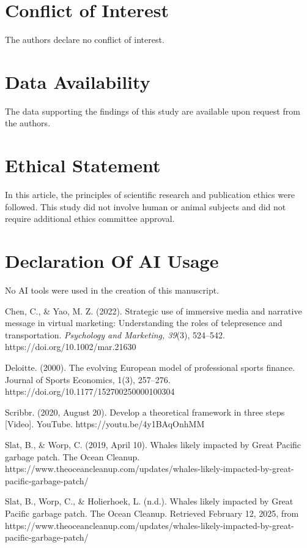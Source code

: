 \documentclass[a4paper]{article}
\begin{document}
\begin{multicols}{2}
\section*{Conflict of Interest}
The authors declare no conflict of interest.

\section*{Data Availability}
The data supporting the findings of this study are available upon request from the authors.

\section*{Ethical Statement}
In this article, the principles of scientific research and publication ethics were followed. This study did not involve human or animal subjects and did not require additional ethics committee approval.

\section*{Declaration Of AI Usage}
No AI tools were used in the creation of this manuscript.

\begin{thebibliography}{8}
 Chen, C., \& Yao, M. Z. (2022). Strategic use of immersive media and narrative message in virtual marketing: Understanding the roles of telepresence and transportation. \textit{Psychology and Marketing, 39}(3), 524–542. https://doi.org/10.1002/mar.21630

 Deloitte. (2000). The evolving European model of professional sports finance. Journal of Sports Economics, 1(3), 257–276. https://doi.org/10.1177/152700250000100304

 Scribbr. (2020, August 20). Develop a theoretical framework in three steps [Video]. YouTube. https://youtu.be/4y1BAqOnhMM

 Slat, B., \& Worp, C. (2019, April 10). Whales likely impacted by Great Pacific garbage patch. The Ocean Cleanup. https://www.theoceancleanup.com/updates/whales-likely-impacted-by-great-pacific-garbage-patch/

 Slat, B., Worp, C., \& Holierhoek, L. (n.d.). Whales likely impacted by Great Pacific garbage patch. The Ocean Cleanup. Retrieved February 12, 2025, from https://www.theoceancleanup.com/updates/whales-likely-impacted-by-great-pacific-garbage-patch/


\end{thebibliography}
\end{multicols}
\end{document}
